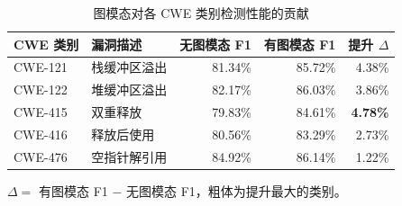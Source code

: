 \begin{table}[htbp]
  \centering
  \caption{图模态对各 CWE 类别检测性能的贡献}
  \label{tab:graph-cwe-contribution}
  \begin{tabular}{llrrr}
    \toprule
    \textbf{CWE 类别} & \textbf{漏洞描述} & \textbf{无图模态 F1} & \textbf{有图模态 F1} & \textbf{提升 $\Delta$} \\
    \midrule
    CWE-121 & 栈缓冲区溢出 & 81.34\% & 85.72\% & 4.38\% \\
    CWE-122 & 堆缓冲区溢出 & 82.17\% & 86.03\% & 3.86\% \\
    CWE-415 & 双重释放 & 79.83\% & 84.61\% & \textbf{4.78\%} \\
    CWE-416 & 释放后使用 & 80.56\% & 83.29\% & 2.73\% \\
    CWE-476 & 空指针解引用 & 84.92\% & 86.14\% & 1.22\% \\
    \bottomrule
  \end{tabular}
  \begin{tablenotes}\small\item $\Delta = $ 有图模态 F1 $-$ 无图模态 F1，粗体为提升最大的类别。\end{tablenotes}
\end{table}